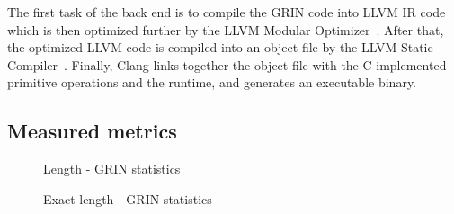 \documentclass[main.tex]{subfiles}
\begin{document}
	The first task of the back end is to compile the GRIN code into LLVM IR code which is then optimized further by the LLVM Modular Optimizer~\cite{opt}. After that, the optimized LLVM code is compiled into an object file by the LLVM Static Compiler~\cite{llc}. Finally, Clang links together the object file with the C-implemented primitive operations and the runtime, and generates an executable binary.
	
	\subsection{Measured metrics}
	
	
	
	
	\begin{figure}
		\hspace{-0.5cm}
		\renewcommand{\figurename}{Diagram}
		\caption{Length - GRIN statistics}
		\label{diagram:length-stats}
		\addtocounter{figure}{-1}
		\begin{minipage}{0.5\textwidth}
		\end{minipage}
		\begin{minipage}{0.5\textwidth}
		\end{minipage}
	\end{figure}

	\begin{figure}
		\hspace{-0.5cm}
		\renewcommand{\figurename}{Diagram}
		\caption{Exact length - GRIN statistics}
		\label{diagram:exact-length-stats}
		\addtocounter{figure}{-1}
		\begin{minipage}{0.5\textwidth}
		\end{minipage}
		\begin{minipage}{0.5\textwidth}
		\end{minipage}
	\end{figure}
	
\end{document}
